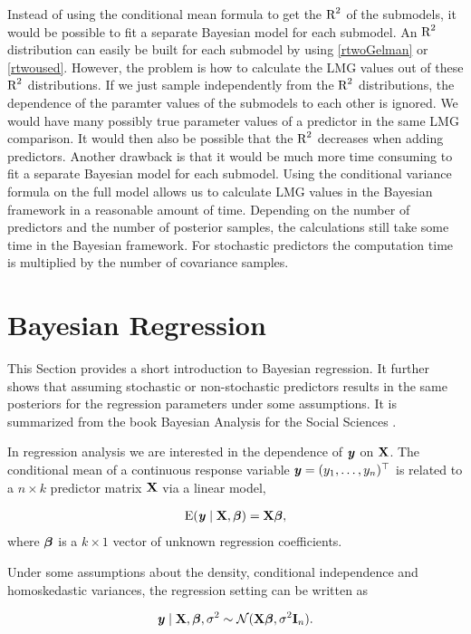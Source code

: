 \documentclass[11pt,a4paper,twoside]{book}
\begin{document}
Instead of using the conditional mean formula to get the $\text{R}^2$ of the submodels,  it would be possible to fit a separate Bayesian model for each submodel. An $\text{R}^2$ distribution can easily be built for each submodel by using \eqref{rtwoGelman} or  \eqref{rtwoused}. However, the problem is how to calculate the LMG values out of these $\text{R}^2$ distributions. If we just sample independently from the $\text{R}^2$ distributions, the dependence of the paramter values of the submodels to each other is ignored. We would have many possibly true parameter values of a predictor in the same LMG comparison. It would then also be possible that the $\text{R}^2$ decreases when adding predictors.  Another drawback is that it would be much more time consuming to fit a separate Bayesian model for each submodel. Using the conditional variance formula on the full model allows us to calculate LMG values in the Bayesian framework in a reasonable amount of time. Depending on the number of predictors and the number of posterior samples, the calculations still take some time in the Bayesian framework. For stochastic predictors the computation time is multiplied by the number of covariance samples.


\section{Bayesian Regression}
This Section provides a short introduction to Bayesian regression. It further shows that assuming stochastic or non-stochastic predictors results in the same posteriors for the regression parameters under some assumptions.  It is summarized from the book Bayesian Analysis for the Social Sciences \citep{Jackman2009}. 

In regression analysis we are interested in the dependence of ${\textbf{\textit{y}}}$ on ${\mathbf{X}}$. The conditional mean of a continuous response variable ${\textbf{\textit{y}}} = (y_{1}, \dots, y_{n})^\top$ is related to a $n \times k$ predictor matrix ${\mathbf{X}}$ via a linear model, 

       \begin{align*} 
\operatorname{E}({\textbf{\textit{y}}} \mid {\mathbf{X}} , {\boldsymbol{\beta}}) = {\mathbf{X}} {\boldsymbol{\beta}} ,
   \end{align*}
where ${\boldsymbol{\beta}}$ is a $k \times 1$ vector of unknown regression coefficients.

Under some assumptions about the density, conditional independence and homoskedastic variances, the regression setting can be written as

       \begin{align*} 
{\textbf{\textit{y}}} \mid {\mathbf{X}} , {\boldsymbol{\beta}}, \sigma^2 \sim \mathcal{N}({\mathbf{X}} {\boldsymbol{\beta}} , \sigma^2 {\mathbf{I}}_{n}) \text{.}
   \end{align*}
\end{document}
